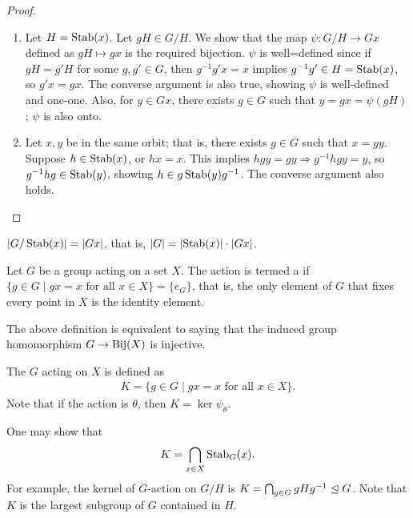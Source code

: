 \begin{proof}
    \begin{enumerate}
        \item Let $H = \operatorname{Stab}(x)$. Let $gH \in G/H$. We show that the map $\psi:G/H \to Gx$ defined as $gH \mapsto gx$ is the required bijection. $\psi$ is well=defined since if $gH = g'H$ for some $g,g' \in G$, then $g^{-1}g'x = x$ implies $g^{-1}g' \in H = \operatorname{Stab}(x)$, so $g'x = gx$. The converse argument is also true, showing $\psi$ is well-defined and one-one. Also, for $y \in Gx$, there exists $g \in G$ such that $y = gx = \psi(gH)$; $\psi$ is also onto.

        \item Let $x,y$ be in the same orbit; that is, there exists $g \in G$ such that $x = gy$. Suppose $h \in \operatorname{Stab}(x)$, or $hx = x$. This implies $hgy = gy \Rightarrow g^{-1}hgy = y$, so $g^{-1}hg \in \operatorname{Stab}(y)$, showing $h \in g\operatorname{Stab}(y)g^{-1}$. The converse argument also holds.
    \end{enumerate}
\end{proof}


\begin{corollary}
    $\left| G/\operatorname{Stab}(x) \right| = \left| Gx \right|$, that is, $\left| G \right| = \left| \operatorname{Stab}(x) \right| \cdot \left| Gx \right|$.
\end{corollary}


\begin{definition}
    Let $G$ be a group acting on a set $X$. The action is termed a  if $\{g \in G \mid gx = x \text{ for all } x \in X\} = \{e_{G}\}$, that is, the only element of $G$ that fixes every point in $X$ is the identity element.
\end{definition}
The above definition is equivalent to saying that the induced group homomorphism $G \to \operatorname{Bij}(X)$ is injective.

\begin{definition}
    The  $G$ acting on $X$ is defined as
    \begin{align}
        K = \{g \in G \mid gx = x \text{ for all } x \in X\}.
    \end{align}
    Note that if the action is $\theta$, then $K = \ker \psi_{\theta}$.
\end{definition}

\noindent One may show that
\begin{align}
    K = \bigcap_{x \in X} \operatorname{Stab}_{G}(x).
\end{align}
For example, the kernel of $G$-action on $G/H$ is $K = \bigcap _{g \in G} gHg^{-1} \trianglelefteq G$. Note that $K$ is the largest subgroup of $G$ contained in $H$.